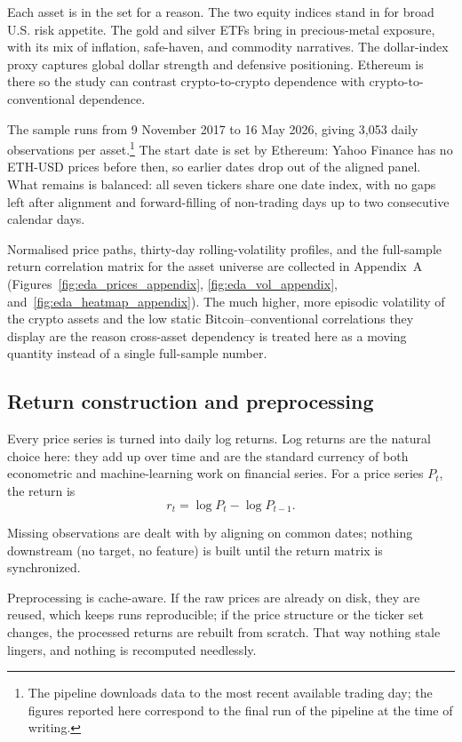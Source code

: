 Each asset is in the set for a reason. The two equity indices stand in for broad U.S. risk appetite. The gold and silver ETFs bring in precious-metal exposure, with its mix of inflation, safe-haven, and commodity narratives. The dollar-index proxy captures global dollar strength and defensive positioning. Ethereum is there so the study can contrast crypto-to-crypto dependence with crypto-to-conventional dependence.

The sample runs from 9 November 2017 to 16 May 2026, giving 3{,}053 daily observations per asset.\footnote{The pipeline downloads data to the most recent available trading day; the figures reported here correspond to the final run of the pipeline at the time of writing.} The start date is set by Ethereum: Yahoo Finance has no ETH-USD prices before then, so earlier dates drop out of the aligned panel. What remains is balanced: all seven tickers share one date index, with no gaps left after alignment and forward-filling of non-trading days up to two consecutive calendar days.

Normalised price paths, thirty-day rolling-volatility profiles, and the full-sample
return correlation matrix for the asset universe are collected in Appendix~A
(Figures~\ref{fig:eda_prices_appendix}, \ref{fig:eda_vol_appendix},
and~\ref{fig:eda_heatmap_appendix}). The much higher, more episodic volatility of the
crypto assets and the low static Bitcoin--conventional correlations they display are
the reason cross-asset dependency is treated here as a moving quantity instead of a
single full-sample number.

\subsection{Return construction and preprocessing}

Every price series is turned into daily log returns. Log returns are the natural choice here: they add up over time and are the standard currency of both econometric and machine-learning work on financial series. For a price series $P_t$, the return is
\[
    r_t = \log P_t - \log P_{t-1}.
\]

Missing observations are dealt with by aligning on common dates; nothing downstream (no target, no feature) is built until the return matrix is synchronized.

Preprocessing is cache-aware. If the raw prices are already on disk, they are reused, which keeps runs reproducible; if the price structure or the ticker set changes, the processed returns are rebuilt from scratch. That way nothing stale lingers, and nothing is recomputed needlessly.


